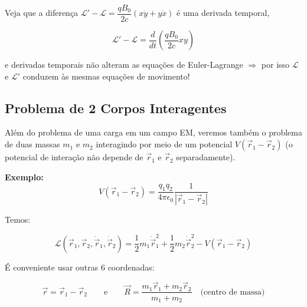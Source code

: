 Veja que a diferença $\mathcal{L}' - \mathcal{L} = \dfrac{qB_0}{2c}(x\dot{y} + y\dot{x})$ é uma derivada temporal,

\begin{equation}
\mathcal{L}' - \mathcal{L} = \frac{d}{dt}\left(\frac{qB_0}{2c}xy\right)
\label{eq:aula8_diferenca_lagrangiana}
\end{equation}

e derivadas temporais não alteram as equações de Euler-Lagrange $\Rightarrow$ por isso $\mathcal{L}$ e $\mathcal{L}'$ conduzem às mesmas equações de movimento!


\subsection*{Problema de 2 Corpos Interagentes}

Além do problema de uma carga em um campo EM, veremos também o problema de duas massas $m_1$ e $m_2$ interagindo por meio de um potencial $V(\vec{r}_1 - \vec{r}_2)$ (o potencial de interação não depende de $\vec{r}_1$ e $\vec{r}_2$ separadamente).

\textbf{Exemplo:}
\begin{equation}
V(\vec{r}_1 - \vec{r}_2) = \frac{q_1 q_2}{4\pi\epsilon_0}\frac{1}{|\vec{r}_1 - \vec{r}_2|}
\label{eq:aula8_potencial_coulomb}
\end{equation}

Temos:

\begin{equation}
\mathcal{L}(\vec{r}_1, \vec{r}_2, \dot{\vec{r}}_1, \dot{\vec{r}}_2) = \frac{1}{2} m_1 \dot{\vec{r}}_1^2 + \frac{1}{2} m_2 \dot{\vec{r}}_2^2 - V(\vec{r}_1 - \vec{r}_2)
\label{eq:aula8_lagrangiana_2corpos}
\end{equation}

É conveniente usar outras 6 coordenadas:

\begin{equation}
\vec{r} = \vec{r}_1 - \vec{r}_2 \qquad \text{e} \qquad \vec{R} = \frac{m_1\vec{r}_1 + m_2\vec{r}_2}{m_1 + m_2} \quad \text{(centro de massa)}
\label{eq:aula8_coordenadas_relativas}
\end{equation}

